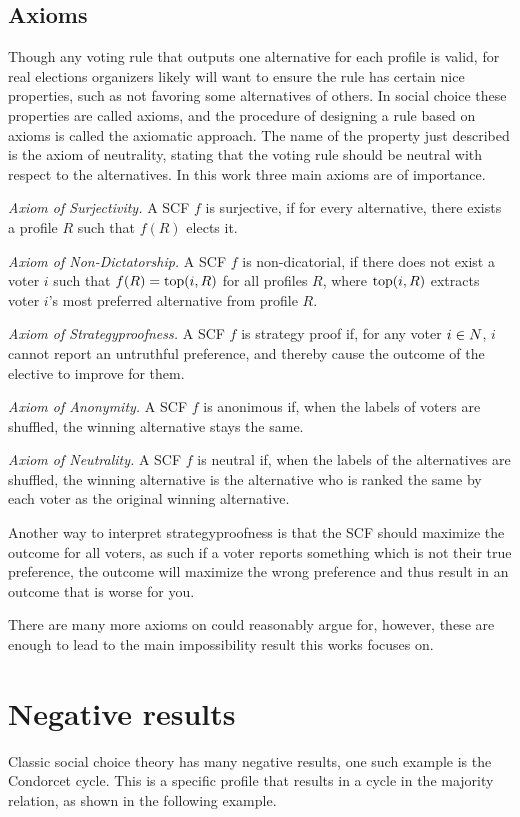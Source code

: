 \subsection{Axioms}
Though any voting rule that outputs one alternative for each profile is valid, for real elections organizers likely will want to ensure the rule has certain nice properties, such as not favoring some alternatives of others. In social choice these properties are called axioms, and the procedure of designing a rule based on axioms is called the axiomatic approach. The name of the property just described is the axiom of neutrality, stating that the voting rule should be neutral with respect to the alternatives. In this work three main axioms are of importance.

\emph{Axiom of Surjectivity.} A SCF $f$ is surjective, if for every alternative, there exists a profile $R$ such that $f(R)$ elects it.

\emph{Axiom of Non-Dictatorship.} A SCF $f$ is non-dicatorial, if there does not exist a voter $i$ such that $f(R) = \textnormal{top}(i,R)$ for all profiles $R$, where $\textnormal{top}(i,R)$  extracts voter $i$'s most preferred alternative from profile $R$.

\emph{Axiom of Strategyproofness.} A SCF $f$ is strategy proof if, for any voter $i \in N$, $i$ cannot report an untruthful preference, and thereby cause the outcome of the elective to improve for them.

\emph{Axiom of Anonymity.} A SCF $f$ is anonimous if, when the labels of voters are shuffled, the winning alternative stays the same.

\emph{Axiom of Neutrality.} A SCF $f$ is neutral if, when the labels of the alternatives are shuffled, the winning alternative is the alternative who is ranked the same by each voter as the original winning alternative.

Another way to interpret strategyproofness is that the SCF should maximize the outcome for all voters, as such  if a voter reports something which is not their true preference, the outcome will maximize the wrong preference and thus result in an outcome that is worse for you.

There are many more axioms on could reasonably argue for, however, these are enough to lead to the main impossibility result this works focuses on.

\section{Negative results}
Classic social choice theory has many negative results, one such example is the Condorcet cycle. This is a specific profile that results in a cycle in the majority relation, as shown in the following example.

